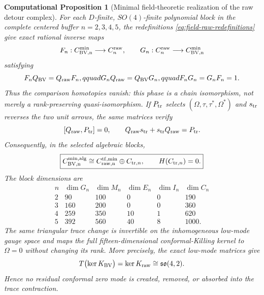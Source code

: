 \documentclass[11pt]{article}
\newtheorem{cproposition}[theorem]{Computational Proposition}
\theoremstyle{definition}
\theoremstyle{remark}
\begin{document}
\begin{cproposition}[Minimal field-theoretic realization of the raw detour complex]
\label{prop:field-BV-dictionary}
For each $D$-finite, $SO(4)$-finite polynomial block in the complete centered
buffer $n=2,3,4,5$, the redefinitions
\eqref{eq:field-raw-redefinitions} give exact rational inverse maps
\begin{equation}
 F_n:C^{\rm min}_{\rm BV,n}\longrightarrow C^{\rm raw}_n,
 \qquad
 G_n:C^{\rm raw}_n\longrightarrow C^{\rm min}_{\rm BV,n}
\end{equation}
satisfying
\begin{equation}\label{eq:minimal-field-raw-chain-maps}
 F_nQ_{\rm BV}=Q_{\rm raw}F_n,qquad
 G_nQ_{\rm raw}=Q_{\rm BV}G_n,qquad
 F_nG_n=G_nF_n=1.
\end{equation}
Thus the comparison homotopies vanish: this phase is a chain isomorphism,
not merely a rank-preserving quasi-isomorphism.  If $P_{\rm tr}$ selects
$(\Omega,\tau,\tau^*,\Omega^*)$ and $s_{\rm tr}$ reverses the two unit
arrows, the same matrices verify
\begin{equation}\label{eq:trace-contraction}
 [Q_{\rm raw},P_{\rm tr}]=0,
 \qquad
 Q_{\rm raw}s_{\rm tr}+s_{\rm tr}Q_{\rm raw}=P_{\rm tr}.
\end{equation}
Consequently, in the selected algebraic blocks,
\begin{equation}\label{eq:minimal-field-direct-sum}
 \boxed{
 C^{\rm min,alg}_{\rm BV,n}
 \cong C^{\rm tf,min}_{\rm raw,n}\oplus C_{{\rm tr},n},
 \qquad H(C_{{\rm tr},n})=0.}
\end{equation}
The block dimensions are
\begin{equation}
\begin{array}{c|rrrr|r}
n&\dim G_n&\dim M_n&\dim E_n&\dim I_n&\dim C_n\\ \hline
2&90&100&0&0&190\\
3&160&200&0&0&360\\
4&259&350&10&1&620\\
5&392&560&40&8&1000.
\end{array}
\end{equation}
The same triangular trace change is invertible on the inhomogeneous
low-mode gauge space and maps the full fifteen-dimensional conformal-Killing
kernel to $\Omega=0$ without changing its rank.  More precisely, the exact
low-mode matrices give
\begin{equation}\label{eq:minimal-zero-mode-identity}
 T\bigl(\ker K_{\rm BV}\bigr)=\ker K_{\rm raw}
 \cong\mathfrak{so}(4,2).
\end{equation}
Hence no residual conformal zero mode is created, removed, or absorbed into
the trace contraction.
\end{cproposition}
\end{document}
